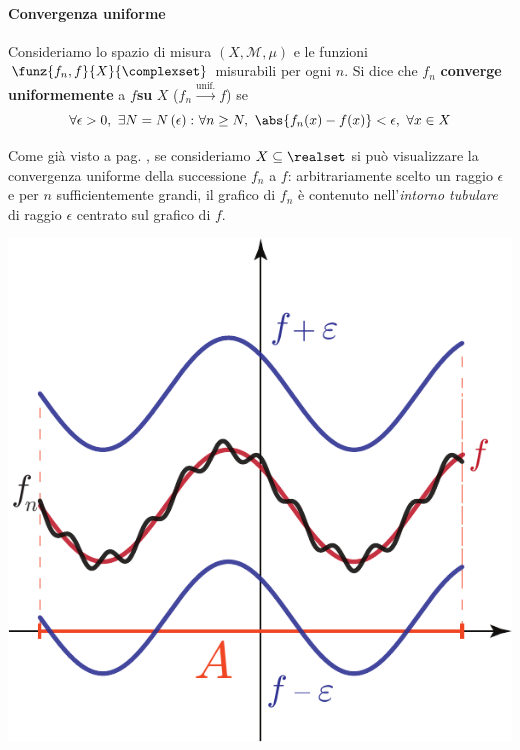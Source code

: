 \paragraph{Convergenza uniforme}
\begin{define}
	Consideriamo lo spazio di misura $\left(X,\mathcal{M},\mu\right)$ e le funzioni $\funz{f_n,f}{X}{\complexset}$ misurabili per ogni $n$.
	Si dice che $f_n$ \textbf{converge uniformemente} a $f$\textbf{su} $X$ ($f_n\overset{\text{unif.}}{\to} f$) se
	\begin{equation}
		\forall \epsilon >0,\ \exists N=N\left(\epsilon\right)\colon \forall n\geq N,\ \abs{f_n(x)-f(x)}<\epsilon,\ \forall x\in X
	\end{equation}
\end{define}
Come già visto a pag. \pageref{visualizzazioneconvergenzauniforme}, se consideriamo $X\subseteq \realset$ si può visualizzare la convergenza uniforme della successione $f_n$ a $f$: arbitrariamente scelto un raggio $\epsilon$ e per $n$ sufficientemente grandi, il grafico di $f_n$ è contenuto nell'\textit{intorno tubulare} di raggio $\epsilon$ centrato sul grafico di $f$.
\begin{center}
	\includegraphics[trim=0cm 0cm 0cm 0cm, clip, scale=0.65]{images/visualizzazioneconvergenzauniforme.pdf}
\end{center}
